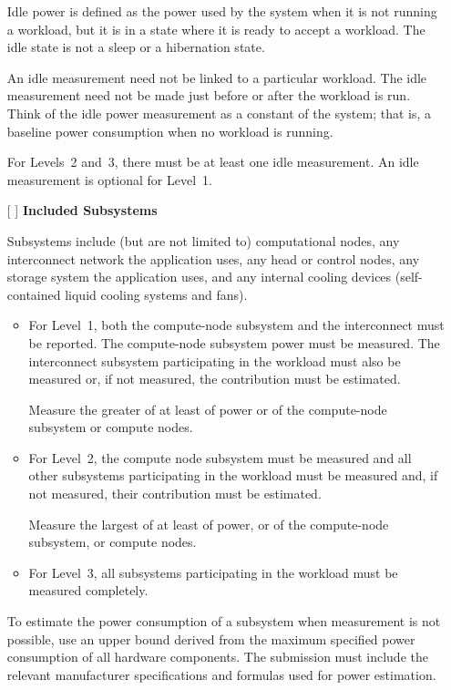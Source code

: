 \begin{itemize}
Idle power is defined as the power used by the system when it is not running a workload, but it is in a state where it is ready to accept a workload.
The idle state is not a sleep or a hibernation state.

An idle measurement need not be linked to a particular workload.
The idle measurement need not be made just before or after the workload is run.
Think of the idle power measurement as a constant of the system; that is,
a baseline power consumption when no workload is running.

For Levels~2 and~3, there must be at least one idle measurement.
An idle measurement is optional for Level~1.

\item[{[ ]}]
\textbf{Included Subsystems}

Subsystems include (but are not limited to) computational nodes, any interconnect network the application uses, any head or control nodes, any storage system the application uses, and any internal cooling devices (self-contained liquid cooling systems and fans).

\begin{itemize}
\item
For Level~1, both the compute-node subsystem and the interconnect must be reported.
The compute-node subsystem power must be measured.
The interconnect subsystem participating in the workload must also be measured or, if not measured, the contribution must be estimated.

Measure the greater of at least \SpecPowerMinLOne{} of power or \SpecFracMinLOne{} of the compute-node subsystem or \SpecMinNodes{} compute nodes.

\item
For Level~2, the compute node subsystem must be measured and all other subsystems participating in the workload must be measured and, if not measured, their contribution must be estimated.

Measure the largest of at least \SpecPowerMinLTwo{} of power, or \SpecFracMinLTwo{} of the compute-node subsystem, or \SpecMinNodes{} compute nodes.

\item
For Level~3, all subsystems participating in the workload must be measured completely.
\end{itemize}

To estimate the power consumption of a subsystem when measurement is not possible, use an upper bound derived from the maximum specified power consumption of all hardware components.
The submission must include the relevant manufacturer specifications and formulas used for power estimation.


\end{itemize}
